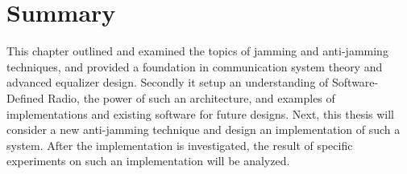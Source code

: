 \section{Summary}
This chapter outlined and examined the topics of jamming and anti-jamming techniques, and provided a foundation in communication system theory and advanced equalizer design.  Secondly it setup an understanding of Software-Defined Radio, the power of such an architecture, and examples of implementations and existing software for future designs.  Next, this thesis will consider a new anti-jamming technique and design an implementation of such a system.  After the implementation is investigated, the result of specific experiments on such an implementation will be analyzed.\\

